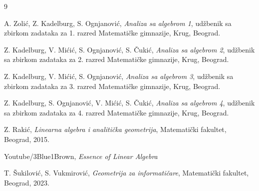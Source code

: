 \documentclass[a4paper,12pt,twoside]{report}
\numberwithin{algorithm}{section}
\begin{document}
\begin{thebibliography}{9}   %

A. Zolić, Z. Kadelburg, S. Ognjanović,
\emph{Analiza sa algebrom 1},
udžbenik sa zbirkom zadataka za 1. razred Matematičke gimnazije,
Krug, Beograd.

Z. Kadelburg, V. Mićić, S. Ognjanović, S. Čukić,
\emph{Analiza sa algebrom 2},
udžbenik sa zbirkom zadataka za 2. razred Matematičke gimnazije,
Krug, Beograd.

Z. Kadelburg, V. Mićić, S. Ognjanović,
\emph{Analiza sa algebrom 3},
udžbenik sa zbirkom zadataka za 3. razred Matematičke gimnazije,
Krug, Beograd.

Z. Kadelburg, S. Ognjanović, V. Mićić, S. Čukić,
\emph{Analiza sa algebrom 4},
udžbenik sa zbirkom zadataka za 4. razred Matematičke gimnazije,
Krug, Beograd.

   Z. Rakić, 
   \emph{Linearna algebra i analitička geometrija}, 
   Matematički fakultet, Beograd, 2015.



Youtube/3Blue1Brown, \emph{Essence of Linear Algebra}

T. Šukilović, S. Vukmirović,
\emph{Geometrija za informatičare},
Matematički fakultet, Beograd, 2023.
\end{thebibliography}                                                                                              
\end{document}
